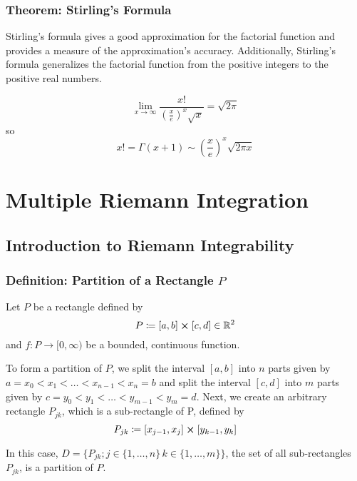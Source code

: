 \documentclass[11pt, a4paper]{article}
\begin{document}
\subsubsection{Theorem: Stirling's Formula}
Stirling's formula gives a good approximation for the factorial function and provides a measure of the approximation's accuracy. Additionally, Stirling's formula generalizes the factorial function from the positive integers to the positive real numbers.

\begin{equation*}
	\lim_{x\rightarrow \infty} \frac{x!}{\left(\frac{x}{e}\right)^x \sqrt{x}} = \sqrt{2\pi}
\end{equation*}
so
\begin{equation*}
	x! = \Gamma(x + 1) \sim \left(\frac{x}{e}\right)^x\sqrt{2\pi x}
\end{equation*}

\newpage

\section{Multiple Riemann Integration}

\subsection{Introduction to Riemann Integrability}

\subsubsection{Definition: Partition of a Rectangle $ P $}
Let $ P $ be a rectangle defined by 
\begin{equation*}
	P \coloneqq [a, b] \cross [c, d] \in \mathbb{R}^2
\end{equation*}
and $ f : P \rightarrow [0, \infty)$ be a bounded, continuous function.

To form a partition of $ P $, we split the interval $ [a, b] $ into $ n $ parts given by $ a = x_0 < x_1 < \dots < x_{n-1} < x_n = b $ and split the interval $ [c, d] $ into $ m $ parts given by $ c = y_0 < y_1 < \dots < y_{m-1} < y_m = d $. Next, we create an arbitrary rectangle $ P_{jk} $, which is a sub-rectangle of P, defined by
\begin{equation*}
	P_{jk} \coloneqq [x_{j-1}, x_j] \cross [y_{k-1}, y_k] \quad  \quad 
\end{equation*}

In this case, $ D = \{P_{jk}; j \in \{1, \dots, n \} \, k \in \{1, \dots, m \}\} $, the set of all sub-rectangles $ P_{jk} $, is a partition of $ P $.
\end{document}

